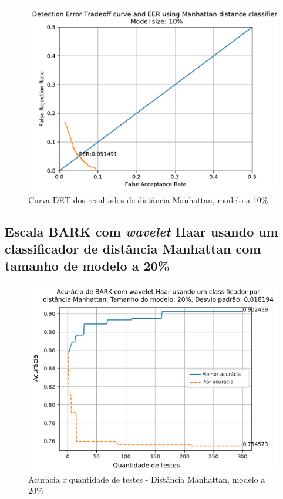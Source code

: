 			\begin{figure}[!ht]
				\centering
				\includegraphics[width=.6\linewidth]{images/results/det/DET_for_classifier_Manhattan_10}
				\caption{Curva DET dos resultados de distância Manhattan, modelo a 10\%}
				\label{fig:detforclassifiermanhattan10}
			\end{figure}
	
			\FloatBarrier
		\subsection{Escala BARK com \textit{wavelet} Haar usando um classificador de distância Manhattan com tamanho de modelo a 20\%}
			
			
	
			\begin{figure}[!ht]
				\centering
				\includegraphics[width=.6\linewidth]{images/results/confusionMatrices/classifier_Manhattan_20.png}
				\caption{Acurácia \textit{x} quantidade de testes - Distância Manhattan, modelo a 20\%}
				\label{fig:classifiermanhattan20}
			\end{figure}
		

